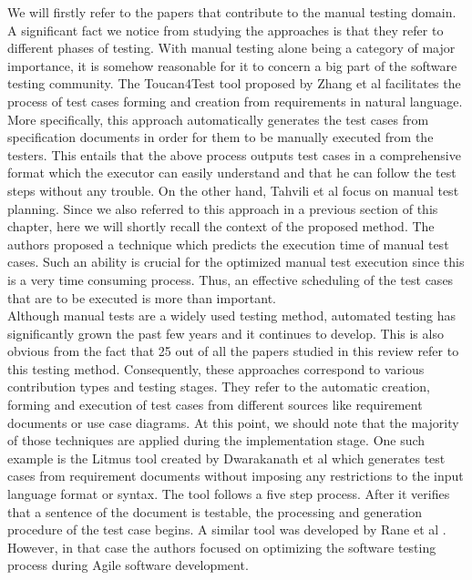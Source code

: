 We will firstly refer to the papers that contribute to the manual testing domain. A significant fact we notice from studying the approaches is that they refer to different phases of testing. With manual 
testing alone being a category of major importance, it is somehow reasonable for it to concern a big part of the software testing community. The Toucan4Test tool proposed by Zhang et al \cite{zhang2014systematic} facilitates 
the process of test cases forming and creation from requirements in natural language. More specifically, this approach automatically generates the test cases from specification documents in order for them to be manually 
executed from the testers. This entails that the above process outputs test cases in a comprehensive format which the executor can easily understand and that he can follow the test steps without any trouble. On 
the other hand, Tahvili et al \cite{8051381} focus on manual test planning. Since we also referred to this approach in a previous section of this chapter, here we will shortly recall the context of the proposed method. 
The authors proposed a technique which predicts the execution time of manual test cases. Such an ability is crucial for the optimized manual test execution since this is a very time consuming process. Thus, 
an effective scheduling of the test cases that are to be executed is more than important.\\

Although manual tests are a widely used testing method, automated testing has significantly grown the past few years and it continues to develop. This is also obvious from the fact that 25 out of all the papers studied 
in this review refer to this testing method. Consequently, these approaches correspond to various contribution types and testing stages. They refer to the automatic creation, forming and execution of test cases from 
different sources like requirement documents or use case diagrams. At this point, we should note that the majority of those techniques are applied during the implementation stage. One such example is the Litmus tool 
created by Dwarakanath et al \cite{litmus} which generates test cases from requirement documents without imposing any restrictions to the input language format or syntax. The tool follows a five step process. After it 
verifies that a sentence of the document is testable, the processing and generation procedure of the test case begins. A similar tool was developed by Rane et al \cite{rane2017automatic}. However, in that case the 
authors focused on optimizing the software testing process during Agile software development.\\

